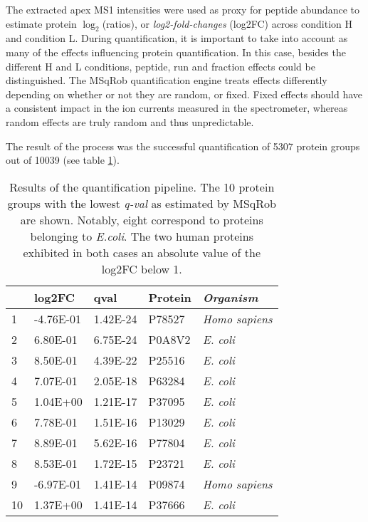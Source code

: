 The extracted apex MS1 intensities were used as proxy for peptide abundance to estimate protein $\log_2$(ratios), or \textit{log2-fold-changes} (\ac{log2FC}) across condition H and condition L. During quantification, it is important to take into account as many of the effects influencing protein quantification. In this case, besides the different H and L conditions, peptide, run and fraction effects could be distinguished. The MSqRob quantification engine treats effects differently depending on whether or not they are random, or fixed. Fixed effects should have a consistent impact in the ion currents measured in the spectrometer, whereas random effects are truly random and thus unpredictable.

The result of the process was the successful quantification of 5307 protein groups out of 10039 (see table \ref{tab:quantification_table}).

\begin{table}[ht]
\centering
\begin{tabular}{llll>{\itshape}l}
  \toprule
 & \ac{log2FC} & qval & Protein & Organism \\ 
  \midrule
1 & -4.76E-01 & 1.42E-24 & P78527 & Homo sapiens \\ 
   \rowcolor[gray]{0.95}2 & 6.80E-01 & 6.75E-24 & P0A8V2 & E. coli \\ 
  3 & 8.50E-01 & 4.39E-22 & P25516 & E. coli \\ 
   \rowcolor[gray]{0.95}4 & 7.07E-01 & 2.05E-18 & P63284 & E. coli \\ 
  5 & 1.04E+00 & 1.21E-17 & P37095 & E. coli \\ 
   \rowcolor[gray]{0.95}6 & 7.78E-01 & 1.51E-16 & P13029 & E. coli \\ 
  7 & 8.89E-01 & 5.62E-16 & P77804 & E. coli \\ 
   \rowcolor[gray]{0.95}8 & 8.53E-01 & 1.72E-15 & P23721 & E. coli \\ 
  9 & -6.97E-01 & 1.41E-14 & P09874 & Homo sapiens \\ 
   \rowcolor[gray]{0.95}10 & 1.37E+00 & 1.41E-14 & P37666 & E. coli \\ 
   \bottomrule
\end{tabular}
\caption[Proteome benchmark dataset quantification results]{Results of the quantification pipeline. The 10 protein groups with the lowest \textit{q-val}  as estimated by MSqRob are shown. Notably, eight correspond to proteins belonging to \textit{E.coli}. The two human proteins exhibited in both cases an absolute value of the \ac{log2FC} below 1.}
\label{tab:quantification_table}
\end{table}

